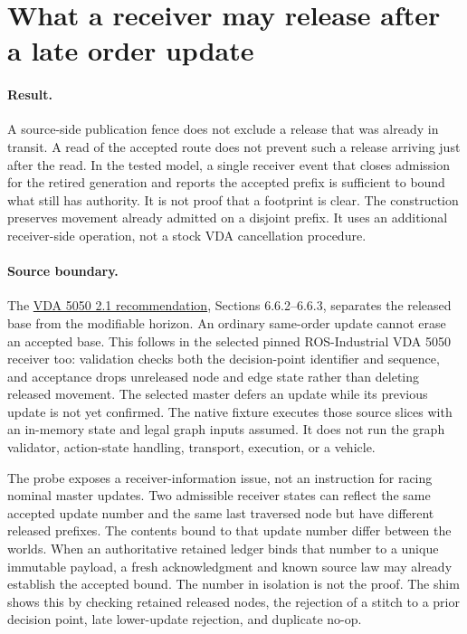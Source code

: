 \documentclass{article}
\begin{document}
\section*{What a receiver may release after a late order update}
\paragraph{Result.}
A source-side publication fence does not exclude a release that was already in transit. A read of the accepted route does not prevent such a release arriving just after the read. In the tested model, a single receiver event that closes admission for the retired generation and reports the accepted prefix is sufficient to bound what still has authority. It is not proof that a footprint is clear. The construction preserves movement already admitted on a disjoint prefix. It uses an additional receiver-side operation, not a stock VDA cancellation procedure.

\paragraph{Source boundary.}
The \href{https://www.vda.de/dam/jcr%3Af0c9c019-1506-4dee-998a-e92723fbf025/EN-VDA5050-V2_1_0_2025-01.pdf}{VDA 5050 2.1 recommendation}, Sections 6.6.2--6.6.3, separates the released base from the modifiable horizon. An ordinary same-order update cannot erase an accepted base. This follows in the selected pinned ROS-Industrial VDA 5050 receiver too: validation checks both the decision-point identifier and sequence, and acceptance drops unreleased node and edge state rather than deleting released movement. The selected master defers an update while its previous update is not yet confirmed. The native fixture executes those source slices with an in-memory state and legal graph inputs assumed. It does not run the graph validator, action-state handling, transport, execution, or a vehicle.

The probe exposes a receiver-information issue, not an instruction for racing nominal master updates. Two admissible receiver states can reflect the same accepted update number and the same last traversed node but have different released prefixes. The contents bound to that update number differ between the worlds. When an authoritative retained ledger binds that number to a unique immutable payload, a fresh acknowledgment and known source law may already establish the accepted bound. The number in isolation is not the proof. The shim shows this by checking retained released nodes, the rejection of a stitch to a prior decision point, late lower-update rejection, and duplicate no-op.
\end{document}
